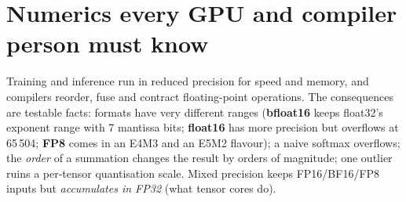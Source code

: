 \documentclass[10pt,a4paper,openany,oneside]{report}
\newcommand{\prio}[1]{\texorpdfstring{\ifcase#1\or{\color{gold}\ding{72}}\or{\color{gold}\ding{72}\ding{72}}\or{\color{gold}\ding{72}\ding{72}\ding{72}}\fi}{}}
\begin{document}
\section{Numerics every GPU and compiler person must know \prio{3}}
\label{sec:mlnum}
Training and inference run in reduced precision for speed and memory, and compilers reorder, fuse and contract floating-point operations. The consequences are testable facts: formats have very different ranges (\textbf{bfloat16} keeps float32's exponent range with 7 mantissa bits; \textbf{float16} has more precision but overflows at 65\,504; \textbf{FP8} comes in an E4M3 and an E5M2 flavour); a naive softmax overflows; the \emph{order} of a summation changes the result by orders of magnitude; one outlier ruins a per-tensor quantisation scale. Mixed precision keeps FP16/BF16/FP8 inputs but \emph{accumulates in FP32} (what tensor cores do).
\end{document}

